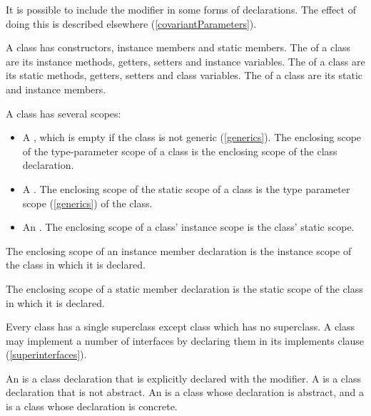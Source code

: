 \documentclass[makeidx]{article}
\begin{document}
\LMHash{}%
It is possible to include the modifier \COVARIANT{} in some forms of declarations.
The effect of doing this is described elsewhere
(\ref{covariantParameters}).

\LMHash{}%
A class has constructors, instance members and static members.
The  of a class
are its instance methods, getters, setters and instance variables.
The  of a class
are its static methods, getters, setters and class variables.
The  of a class
are its static and instance members.

\LMHash{}%
A class has several scopes:
\begin{itemize}
\item A ,
  which is empty if the class is not generic (\ref{generics}).
The enclosing scope of the type-parameter scope of a class is the enclosing scope of the class declaration.
\item A .
The enclosing scope of the static scope of a class is the type parameter scope (\ref{generics}) of the class.
\item An .
The enclosing scope of a class' instance scope is the class' static scope.
\end{itemize}

\LMHash{}%
The enclosing scope of an instance member declaration is the instance scope of the class in which it is declared.

\LMHash{}%
The enclosing scope of a static member declaration is the static scope of the class in which it is declared.

\LMHash{}%
Every class has a single superclass except class  which has no superclass.
A class may implement a number of interfaces by declaring them in its implements clause (\ref{superinterfaces}).

\LMHash{}%
An 
is a class declaration that is explicitly declared
with the \ABSTRACT{} modifier.
A 
is a class declaration that is not abstract.
An  is a class
whose declaration is abstract, and
a  is a class
whose declaration is concrete.

\end{document}
